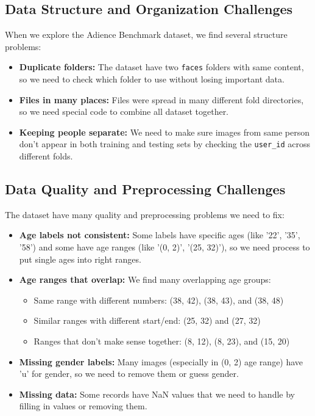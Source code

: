 \documentclass{article}
\begin{document}
\subsection{Data Structure and Organization Challenges}
When we explore the Adience Benchmark dataset, we find several structure problems:

\begin{itemize}
    \item \textbf{Duplicate folders:} The dataset have two \texttt{faces} folders with same content, so we need to check which folder to use without losing important data.

    \item \textbf{Files in many places:} Files were spread in many different fold directories, so we need special code to combine all dataset together.

    \item \textbf{Keeping people separate:} We need to make sure images from same person don't appear in both training and testing sets by checking the \texttt{user\_id} across different folds.
\end{itemize}

\subsection{Data Quality and Preprocessing Challenges}
The dataset have many quality and preprocessing problems we need to fix:

\begin{itemize}
    \item \textbf{Age labels not consistent:} Some labels have specific ages (like '22', '35', '58') and some have age ranges (like '(0, 2)', '(25, 32)'), so we need process to put single ages into right ranges.

    \item \textbf{Age ranges that overlap:} We find many overlapping age groups:
    \begin{itemize}
        \item Same range with different numbers: (38, 42), (38, 43), and (38, 48)
        \item Similar ranges with different start/end: (25, 32) and (27, 32)
        \item Ranges that don't make sense together: (8, 12), (8, 23), and (15, 20)
    \end{itemize}

    \item \textbf{Missing gender labels:} Many images (especially in (0, 2) age range) have 'u' for gender, so we need to remove them or guess gender.

    \item \textbf{Missing data:} Some records have NaN values that we need to handle by filling in values or removing them.
\end{itemize}
\end{document}
